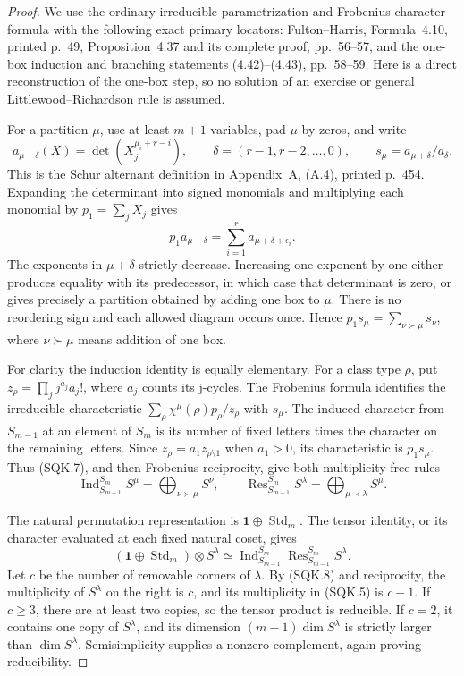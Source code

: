 \begin{proof}
We use the ordinary irreducible parametrization and Frobenius
character formula with the following exact primary locators:
Fulton--Harris, Formula~4.10, printed p.~49, Proposition~4.37
and its complete proof, pp.~56--57, and the one-box induction
and branching statements (4.42)--(4.43), pp.~58--59.
\cite{HK:FultonHarris1991}
Here is a direct reconstruction of the one-box step, so no
solution of an exercise or general Littlewood--Richardson rule
is assumed.

For a partition \(\mu\), use at least \(m+1\) variables, pad
\(\mu\) by zeros, and write
\[
 a_{\mu+\delta}(X)=\det(X_j^{\mu_i+r-i}),\qquad
 \delta=(r-1,r-2,\ldots,0),\qquad
 s_\mu=a_{\mu+\delta}/a_\delta .
 \tag{SQK.6}
\]
This is the Schur alternant definition in Appendix~A, (A.4),
printed p.~454.  Expanding the determinant into signed monomials
and multiplying each monomial by \(p_1=\sum_jX_j\) gives
\[
       p_1a_{\mu+\delta}
          =\sum_{i=1}^r a_{\mu+\delta+\epsilon_i}.
 \tag{SQK.7}
\]
The exponents in \(\mu+\delta\) strictly decrease.  Increasing
one exponent by one either produces equality with its predecessor,
in which case that determinant is zero, or gives precisely a
partition obtained by adding one box to \(\mu\).  There is no
reordering sign and each allowed diagram occurs once.  Hence
\(p_1s_\mu=\sum_{\nu\succ\mu}s_\nu\), where \(\nu\succ\mu\)
means addition of one box.

For clarity the induction identity is equally elementary.
For a class type \(\rho\), put
\(z_\rho=\prod_j j^{a_j}a_j!\), where \(a_j\) counts its
j-cycles.  The Frobenius formula identifies the irreducible
characteristic \(\sum_\rho\chi^\mu(\rho)p_\rho/z_\rho\)
with \(s_\mu\).  The induced character from \(S_{m-1}\) at
an element of \(S_m\) is its number of fixed letters times
the character on the remaining letters.  Since
\(z_\rho=a_1z_{\rho\setminus1}\) when \(a_1>0\), its
characteristic is \(p_1s_\mu\).  Thus (SQK.7), and then
Frobenius reciprocity, give both multiplicity-free rules
\[
 \operatorname{Ind}_{S_{m-1}}^{S_m}S^\mu
       =\bigoplus_{\nu\succ\mu}S^\nu,\qquad
 \operatorname{Res}_{S_{m-1}}^{S_m}S^\lambda
       =\bigoplus_{\mu\prec\lambda}S^\mu .
 \tag{SQK.8}
\]

The natural permutation representation is
\(\mathbf1\oplus\operatorname{Std}_m\).  The tensor identity,
or its character evaluated at each fixed natural coset, gives
\[
  (\mathbf1\oplus\operatorname{Std}_m)\otimes S^\lambda
       \simeq
       \operatorname{Ind}_{S_{m-1}}^{S_m}
            \operatorname{Res}_{S_{m-1}}^{S_m}S^\lambda.
 \tag{SQK.9}
\]
Let \(c\) be the number of removable corners of \(\lambda\).
By (SQK.8) and reciprocity, the multiplicity of \(S^\lambda\)
on the right is \(c\), and its multiplicity in (SQK.5) is
\(c-1\).  If \(c\ge3\), there are at least two copies, so
the tensor product is reducible.  If \(c=2\), it contains
one copy of \(S^\lambda\), and its dimension
\((m-1)\dim S^\lambda\) is strictly larger than
\(\dim S^\lambda\).  Semisimplicity supplies a nonzero
complement, again proving reducibility.


\end{proof}
